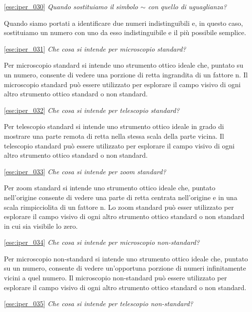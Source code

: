 \ref{ese:iper_030} 
\emph{Quando sostituiamo il simbolo \(\sim\) con quello di uguaglianza?}

Quando siamo portati a identificare due numeri indistinguibili e, in questo 
caso, sostituiamo un numero con uno da esso indistinguibile e il più possibile 
semplice.

\ref{ese:iper_031} 
\emph{Che cosa si intende per microscopio standard?}

Per microscopio standard si intende uno strumento ottico ideale che, puntato su 
un numero, consente di vedere una porzione di retta ingrandita di un fattore n. 
Il microscopio standard può essere utilizzato per esplorare il campo visivo 
di ogni altro strumento ottico standard o non standard.

\ref{ese:iper_032} 
\emph{Che cosa si intende per telescopio standard?}

Per telescopio standard si intende uno strumento ottico ideale in grado di 
mostrare una parte remota di retta nella stessa scala della parte vicina. Il 
telescopio standard può essere utilizzato per esplorare il campo visivo di ogni 
altro strumento ottico standard o non standard.

\ref{ese:iper_033} 
\emph{Che cosa si intende per zoom standard?}

Per zoom standard si intende uno strumento ottico ideale che, puntato 
nell'origine consente di vedere una parte di retta centrata nell'origine e in 
una scala rimpicciolita di un fattore n. Lo zoom standard può esser utilizzato 
per esplorare il campo visivo di ogni altro strumento ottico standard o non 
standard in cui sia visibile lo zero.

\ref{ese:iper_034} 
\emph{Che cosa si intende per microscopio non-standard?}

Per microscopio non-standard si intende uno strumento ottico ideale che, 
puntato su un numero, consente di vedere un'opportuna porzione di numeri 
infinitamente vicini a quel numero. 
Il microscopio non-standard può essere utilizzato per esplorare il campo 
visivo di ogni altro strumento ottico standard o non standard.


\ref{ese:iper_035} 
\emph{Che cosa si intende per telescopio non-standard?}

